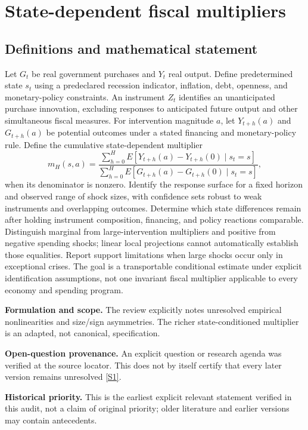 \documentclass[11pt]{article}
\newcommand{\sref}[2]{\hyperlink{source:#1:#2}{[S#2]}}
\begin{document}
\section*{State-dependent fiscal multipliers}\label{30007532}
\subsection{Definitions and mathematical statement}
Let \(G_t\) be real government purchases and \(Y_t\) real output. Define predetermined state \(s_t\) using a predeclared recession indicator, inflation, debt, openness, and monetary-policy constraints. An instrument \(Z_t\) identifies an unanticipated purchase innovation, excluding responses to anticipated future output and other simultaneous fiscal measures. For intervention magnitude \(a\), let \(Y_{t+h}(a)\) and \(G_{t+h}(a)\) be potential outcomes under a stated financing and monetary-policy rule. Define the cumulative state-dependent multiplier
\[
m_H(s,a)=
\frac{\sum_{h=0}^H E[Y_{t+h}(a)-Y_{t+h}(0)\mid s_t=s]}
{\sum_{h=0}^H E[G_{t+h}(a)-G_{t+h}(0)\mid s_t=s]},
\]
when its denominator is nonzero. Identify the response surface for a fixed horizon and observed range of shock sizes, with confidence sets robust to weak instruments and overlapping outcomes. Determine which state differences remain after holding instrument composition, financing, and policy reactions comparable. Distinguish marginal from large-intervention multipliers and positive from negative spending shocks; linear local projections cannot automatically establish those equalities. Report support limitations when large shocks occur only in exceptional crises. The goal is a transportable conditional estimate under explicit identification assumptions, not one invariant fiscal multiplier applicable to every economy and spending program.

\par\textbf{Formulation and scope.} The review explicitly notes unresolved empirical nonlinearities and size/sign asymmetries. The richer state-conditioned multiplier is an adapted, not canonical, specification.

\par\textbf{Open-question provenance.} An explicit question or research agenda was verified at the source locator. This does not by itself certify that every later version remains unresolved \sref{30007532}{1}.

\par\textbf{Historical priority.} This is the earliest explicit relevant statement verified in this audit, not a claim of original priority; older literature and earlier versions may contain antecedents.
\end{document}
